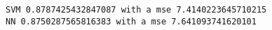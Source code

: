 \documentclass[11pt]{article}
\begin{document}
    \begin{Verbatim}[commandchars=\\\{\}]
SVM 0.8787425432847087 with a mse 7.4140223645710215
NN 0.8750287565816383 with a mse 7.641093741620101

    \end{Verbatim}

    \begin{center}
    \end{center}
    { \hspace*{\fill} \\}
    

    
    
    
    
\end{document}
